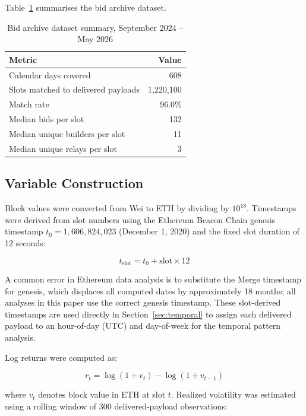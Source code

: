 \documentclass[11pt]{article}
\begin{document}
Table~\ref{tab:bidarchive} summarises the bid archive dataset.

\begin{table}[h]
\centering
\caption{Bid archive dataset summary, September 2024 -- May 2026}
\label{tab:bidarchive}
\begin{tabular}{lr}
\toprule
Metric & Value \\
\midrule
Calendar days covered & 608 \\
Slots matched to delivered payloads & 1,220,100 \\
Match rate & 96.0\% \\
Median bids per slot & 132 \\
Median unique builders per slot & 11 \\
Median unique relays per slot & 3 \\
\bottomrule
\end{tabular}
\end{table}

\subsection{Variable Construction}

Block values were converted from Wei to ETH by dividing by $10^{18}$.
Timestamps were derived from slot numbers using the Ethereum Beacon Chain
genesis timestamp $t_0 = 1{,}606{,}824{,}023$ (December 1, 2020) and the fixed
slot duration of 12 seconds:

\begin{equation}
t_{\text{slot}} = t_0 + \text{slot} \times 12
\label{eq:timestamp}
\end{equation}

A common error in Ethereum data analysis is to substitute the Merge timestamp
for genesis, which displaces all computed dates by approximately 18 months; all
analyses in this paper use the correct genesis timestamp. These slot-derived
timestamps are used directly in Section~\ref{sec:temporal} to assign each delivered payload to
an hour-of-day (UTC) and day-of-week for the temporal pattern analysis.

Log returns were computed as:

\begin{equation}
r_t = \log(1 + v_t) - \log(1 + v_{t-1})
\label{eq:logreturn}
\end{equation}

where $v_t$ denotes block value in ETH at slot $t$. Realized volatility was
estimated using a rolling window of 300 delivered-payload observations:
\end{document}
